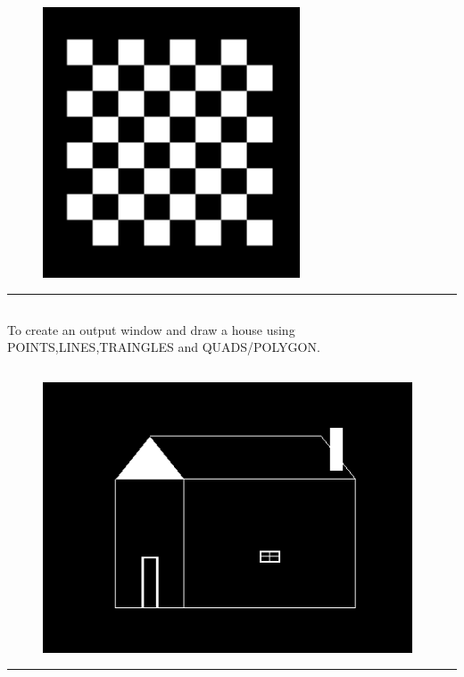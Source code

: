 \documentclass[12pt,letterpaper]{article}
\begin{document}
\subsection*{}
\begin{figure}[h]
    \centering
    \includegraphics[height=8cm, keepaspectratio]{Chessboard/Outputs/Chessboard.png}
\end{figure}

\hrule
\bigskip\bigskip
\newpage
\subsection*{}
\begin{flushleft}
    To create an output window and draw a house using POINTS,LINES,TRAINGLES and QUADS/POLYGON. 
\end{flushleft}

\subsection*{}
\begin{flushleft}




\end{flushleft}
\subsection*{}
\begin{figure}[h]
    \centering
    \includegraphics[height=8cm, keepaspectratio]{House/Outputs/house.png}
\end{figure}
\hrule
\end{document}

